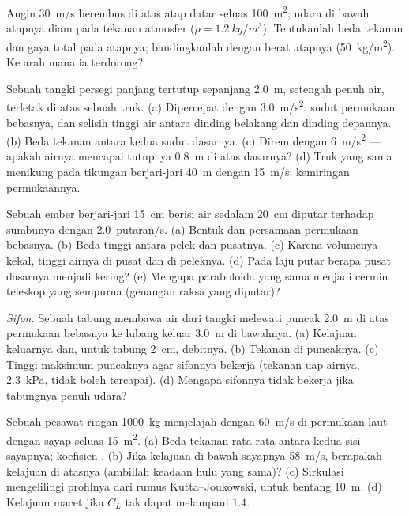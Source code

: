 \begin{exercise}[$\star$]\label{exo:b2:euler-bernoulli:4}
Angin \qty{30}{m/s} berembus di atas atap datar seluas \qty{100}{m^2};
udara di bawah atapnya diam pada tekanan atmosfer ($\rho = \qty{1.2}{kg/m^3}$).
Tentukanlah beda tekanan dan gaya total pada atapnya; bandingkanlah
dengan berat atapnya (\qty{50}{kg/m^2}). Ke arah mana ia terdorong?
\end{exercise}

\begin{exercise}[$\star\star$]\label{exo:b2:euler-bernoulli:5}
Sebuah tangki persegi panjang tertutup sepanjang \qty{2.0}{m}, setengah penuh air, terletak di atas
sebuah truk. (a) Dipercepat dengan \qty{3.0}{m/s^2}: sudut permukaan bebasnya,
dan selisih tinggi air antara dinding belakang dan dinding depannya.
(b) Beda tekanan antara kedua sudut dasarnya. (c)
Direm dengan \qty{6}{m/s^2} --- apakah airnya mencapai tutupnya \qty{0.8}{m} di atas
dasarnya? (d) Truk yang sama menikung pada tikungan berjari-jari \qty{40}{m} dengan
\qty{15}{m/s}: kemiringan permukaannya.
\end{exercise}

\begin{exercise}[$\star\star$]\label{exo:b2:euler-bernoulli:6}
Sebuah ember berjari-jari \qty{15}{cm} berisi air sedalam \qty{20}{cm} diputar
terhadap sumbunya dengan \qty{2.0}{putaran/s}. (a) Bentuk dan persamaan permukaan
bebasnya. (b) Beda tinggi antara pelek dan pusatnya. (c) Karena volumenya
kekal, tinggi airnya di pusat dan di peleknya. (d) Pada
laju putar berapa pusat dasarnya menjadi kering? (e) Mengapa
paraboloida yang sama menjadi cermin teleskop yang sempurna (genangan
raksa yang diputar)?
\end{exercise}

\begin{exercise}[$\star\star$]\label{exo:b2:euler-bernoulli:7}
\emph{Sifon.} Sebuah tabung membawa air dari tangki melewati puncak \qty{2.0}{m}
di atas permukaan bebasnya ke lubang keluar \qty{3.0}{m} di bawahnya. (a) Kelajuan
keluarnya dan, untuk tabung \qty{2}{cm}, debitnya. (b) Tekanan di puncaknya. (c)
Tinggi maksimum puncaknya agar sifonnya bekerja (tekanan uap airnya,
\qty{2.3}{kPa}, tidak boleh tercapai). (d) Mengapa sifonnya
tidak bekerja jika tabungnya penuh udara?
\end{exercise}

\begin{exercise}[$\star\star$]\label{exo:b2:euler-bernoulli:8}
Sebuah pesawat ringan \qty{1000}{kg} menjelajah dengan \qty{60}{m/s} di permukaan laut dengan
sayap seluas \qty{15}{m^2}. (a) Beda tekanan rata-rata antara kedua
sisi sayapnya; koefisien . (b) Jika kelajuan di bawah sayapnya
\qty{58}{m/s}, berapakah kelajuan di atasnya (ambillah keadaan hulu yang
sama)? (c) Sirkulasi mengelilingi profilnya dari rumus
Kutta--Joukowski, untuk bentang \qty{10}{m}. (d) Kelajuan macet jika
$C_L$ tak dapat melampaui $1.4$.
\end{exercise}

